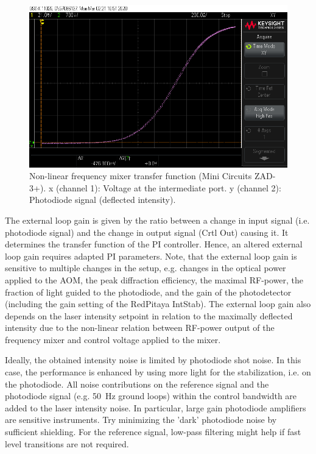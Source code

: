 \documentclass[twoside,a4paper]{refart}
\begin{document}
\begin{figure}[H]
	\includegraphics[width=\textwidth]{fig/mixer.png}
	\caption{Non-linear frequency mixer transfer function (Mini Circuits ZAD-3+). x (channel 1): Voltage at the intermediate port. y (channel 2): Photodiode signal (deflected intensity).  \label{fig:ZAD3}}
\end{figure} 

 
The external loop gain is given by the ratio between a change in input signal (i.e. photodiode signal) and the change in output signal (Crtl Out) causing it. It determines the transfer function of the PI controller. Hence, an altered external loop gain requires adapted PI parameters. Note, that the external loop gain is sensitive to multiple changes in the setup, e.g. changes in the optical power applied to the AOM, the peak diffraction efficiency, the maximal RF-power,  the fraction of light guided to the photodiode, and the gain of the photodetector (including the gain setting of the RedPitaya IntStab). The external loop gain also depends on the laser intensity setpoint in relation to the maximally deflected intensity due to the non-linear relation between RF-power output of the frequency mixer and control voltage applied to the mixer.

  

 
Ideally, the obtained intensity noise is limited by photodiode shot noise. In this case, the performance is enhanced by using more light for the stabilization, i.e. on the photodiode. All noise contributions on the reference signal and the photodiode signal (e.g. \SI{50}{\hertz} ground loops) within the control bandwidth are added to the laser intensity noise. In particular, large gain photodiode amplifiers are sensitive instruments. Try minimizing the 'dark' photodiode noise by sufficient shielding. For the reference signal, low-pass filtering might help if fast level transitions are not required.
\end{document}
